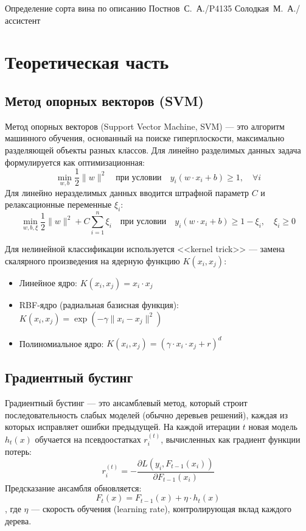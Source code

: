 \documentclass{itmo}
\begin{document}
\makecourseworktitle
	{}
	{}
	{Определение сорта вина по описанию}
	{Постнов~С.~А./P4135}
	{Солодкая~М.~А./ассистент}
	{}{}{}

\maketableofcontents

\chapter{Теоретическая часть}

\section{Метод опорных векторов (SVM)}

Метод опорных векторов (Support Vector Machine, SVM) --- это алгоритм машинного обучения, основанный на поиске гиперплоскости, максимально разделяющей объекты разных классов.
Для линейно разделимых данных задача формулируется как оптимизационная:
\[
	\min_{w, b} \frac{1}{2} \|w\|^2 \quad \text{при условии} \quad y_i(w \cdot x_i + b) \geq 1, \quad \forall i
\]
Для линейно неразделимых данных вводится штрафной параметр $C$ и релаксационные переменные $\xi_i$:
\[
	\min_{w, b, \xi} \frac{1}{2} \|w\|^2 + C \sum_{i=1}^{n} \xi_i \quad \text{при условии} \quad y_i(w \cdot x_i + b) \geq 1 - \xi_i, \quad \xi_i \geq 0
\]

Для нелинейной классификации используется <<kernel trick>> --- замена скалярного произведения на ядерную функцию $K(x_i, x_j)$:
\begin{itemize}
	\item Линейное ядро: $K(x_i, x_j) = x_i \cdot x_j$
	\item RBF-ядро (радиальная базисная функция): $K(x_i, x_j) = \exp(-\gamma \|x_i - x_j\|^2)$
	\item Полиномиальное ядро: $K(x_i, x_j) = (\gamma \cdot x_i \cdot x_j + r)^d$
\end{itemize}

\section{Градиентный бустинг}

Градиентный бустинг --- это ансамблевый метод, который строит последовательность слабых моделей (обычно деревьев решений), каждая из которых исправляет ошибки предыдущей.
На каждой итерации $t$ новая модель $h_t(x)$ обучается на псевдоостатках $r_i^{(t)}$, вычисленных как градиент функции потерь:
\[
	r_i^{(t)} = -\frac{\partial L(y_i, F_{t-1}(x_i))}{\partial F_{t-1}(x_i)}
\]
Предсказание ансамбля обновляется:
\[
	F_t(x) = F_{t-1}(x) + \eta \cdot h_t(x)
\]
, где $\eta$ --- скорость обучения (learning rate), контролирующая вклад каждого дерева.
\end{document}
